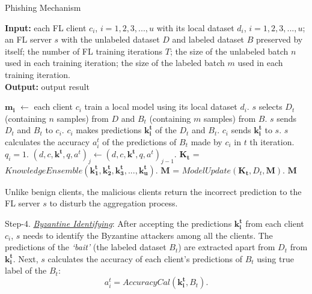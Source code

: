 \documentclass[journal]{IEEEtran}
\begin{document}
\begin{algorithm}[t]
  \caption{Phishing Mechanism} 
  \hspace*{0.02in} {\bf Input:} 
  each FL client $c_i$, $i=1,2,3,...,u$ with its local dataset $d_i$, $i=1,2,3,...,u$; an FL server $s$ with the unlabeled dataset $D$ and labeled dataset $B$ preserved by itself; the number of FL training iterations $T$; the size of the unlabeled batch $n$ used in each training iteration; the size of the labeled batch $m$ used in each training iteration.\\
  \hspace*{0.02in} {\bf Output:} 
  output result
  \begin{algorithmic}[1]
    \State $\mathbf{m_i}$ $\gets$ each client $c_i$ train a local model using its local dataset $d_i$.
      \State $s$ selects $D_t$ (containing $n$ samples) from $D$ and $B_t$ (containing $m$ samples) from $B$.
        \State $s$ sends $D_t$ and $B_t$ to $c_i$.
        \State $c_i$ makes predictions $\mathbf{k_i^t}$ of the $D_t$ and $B_t$.
        \State $c_i$ sends $\mathbf{k_i^t}$ to $s$.
        \State $s$ calculates the accuracy $a_i^t$ of the predictions of $B_t$ made by $c_i$ in $t$ th iteration.
          \State $q_i = 1$.
            \State $(d,c,\mathbf{k^t},q,a^t)_j \gets (d,c,\mathbf{k^t},q,a^t)_{j-1}$.
          \EndFor
        \EndIf
      \EndFor
      \State $\mathbf{K_t}$ = $KnowledgeEnsemble(\mathbf{k_1^t},\mathbf{k_2^t},\mathbf{k_3^t},...,\mathbf{k_u^t})$.
      \State $\mathbf{M}$ = $ModelUpdate(\mathbf{K_t}, D_t, \mathbf{M})$.
    \EndFor
    \State\Return $\mathbf{M}$
  \end{algorithmic}
  \end{algorithm}
Unlike benign clients, the malicious clients return the incorrect prediction to the FL server $s$ to disturb the aggregation process.
\par Step-4. \ul{\textit{Byzantine Identifying}}: After accepting the predictions $\mathbf{k_i^t}$ from each client $c_i$, $s$ needs to identify the Byzantine attackers among all the clients. The predictions of the \textit{`bait'} (the labeled dataset $B_t$) are extracted apart from $D_t$ from $\mathbf{k_i^t}$. Next, $s$ calculates the accuracy of each client's predictions of $B_t$ using true label of the $B_t$:
\begin{equation}
  a_i^t=AccuracyCal(\mathbf{k_i^t}, B_t).
\end{equation}
\end{document}

